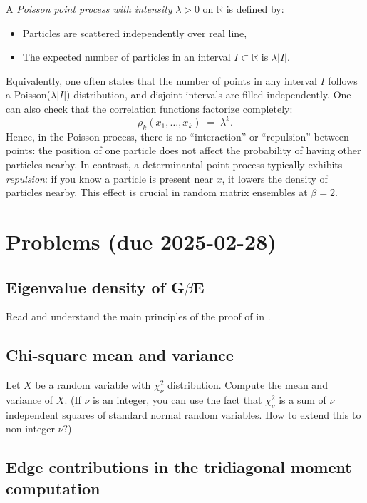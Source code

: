 \documentclass[letterpaper,11pt,oneside,reqno]{article}
\numberwithin{equation}{section}
\theoremstyle{definition}
\begin{document}
A \emph{Poisson point process with intensity} \(\lambda>0\) on \(\mathbb{R}\) is defined by:
\begin{itemize}
	\item Particles are scattered independently over real line,
	\item The expected number of particles in an interval \(I\subset \mathbb{R}\) is \(\lambda|I|\).
\end{itemize}
Equivalently, one often states that the number of points in any interval \(I\) follows a Poisson(\(\lambda|I|\)) distribution, and disjoint intervals are filled independently.  One can also check that the correlation functions factorize completely:
\[
\rho_k(x_1,\dots,x_k) \;=\; \lambda^k.
\]
Hence, in the Poisson process, there is no ``interaction'' or ``repulsion'' between points: the position of one particle does not affect the probability of having other particles nearby.  In contrast, a determinantal point process typically exhibits \emph{repulsion}: if you know a particle is present near \(x\), it lowers the density of particles nearby.  This effect is crucial in random matrix ensembles at \(\beta=2\).




\appendix
\setcounter{section}{3}

\section{Problems (due 2025-02-28)}

\subsection{Eigenvalue density of G$\beta$E}

Read and understand the main principles of the
proof of 
in \cite{dumitriu2002matrix}.

\subsection{Chi-square mean and variance}

Let $X$ be a random variable with $\chi^2_\nu$ distribution. Compute the mean and variance of $X$.
(If $\nu$ is an integer, you can use the fact that $\chi^2_\nu$ is a sum of $\nu$ independent squares of standard normal random variables.
How to extend this to non-integer \(\nu\)?)

\subsection{Edge contributions in the tridiagonal moment computation}
\label{prob:edges-in-tridiagonal}
\end{document}
